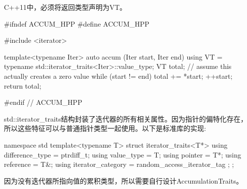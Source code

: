 \begin{notice}C++11中，必须将返回类型声明为VT。
\end{notice}

\begin{cpp}
#ifndef ACCUM_HPP
#define ACCUM_HPP

#include <iterator>

template<typename Iter>
auto accum (Iter start, Iter end)
{
	using VT = typename std::iterator_traits<Iter>::value_type;
	VT total{}; // assume this actually creates a zero value
	while (start != end) {
		total += *start;
		++start;
	}
	return total;
}

#endif // ACCUM_HPP
\end{cpp}

std::iterator\_traits结构封装了迭代器的所有相关属性。因为指针的偏特化存在，所以这些特征可以与普通指针类型一起使用。以下是标准库的实现:

\begin{cpp}
namespace std {
	template<typename T>
	struct iterator_traits<T*> {
		using difference_type = ptrdiff_t;
		using value_type = T;
		using pointer = T*;
		using reference = T&;
		using iterator_category = random_access_iterator_tag ;
	};
}
\end{cpp}

因为没有迭代器所指向值的累积类型，所以需要自行设计AccumulationTraits。









